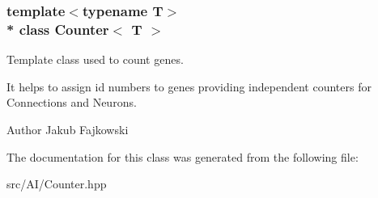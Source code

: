 \subsubsection*{template$<$typename T$>$\\*
class Counter$<$ T $>$}

Template class used to count genes. 

It helps to assign id numbers to genes providing independent counters for Connections and Neurons. \begin{DoxyAuthor}{Author}
Jakub Fajkowski 
\end{DoxyAuthor}


The documentation for this class was generated from the following file\+:\begin{DoxyCompactItemize}
\item 
src/\+A\+I/Counter.\+hpp\end{DoxyCompactItemize}
